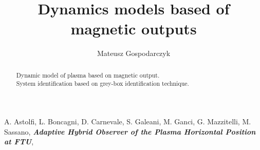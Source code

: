 \documentclass[]{report}
\title{Dynamics models based of magnetic outputs}
\author{Mateusz Gospodarczyk}
\begin{document}
\maketitle

\begin{abstract}
	
	Dynamic model of plasma based on magnetic output.\\
	System identification based on grey-box identification technique.\\
	
	
	
\end{abstract}


\begin{thebibliography}{9}
	A. Astolfi, L. Boncagni, D. Carnevale, S. Galeani, M. Ganci, G. Mazzitelli, M. Sassano,	
	\emph{\textbf{Adaptive Hybrid Observer of the Plasma Horizontal Position at FTU}},
	
\end{thebibliography}
\end{document}
